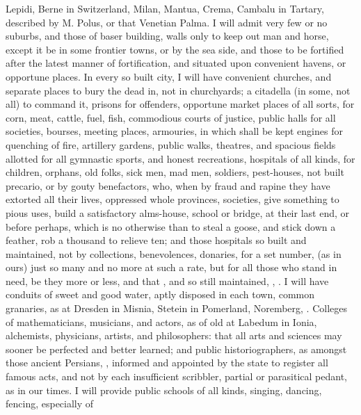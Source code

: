 Lepidi, Berne in Switzerland, Milan, Mantua, Crema, Cambalu in Tartary,
described by M. Polus, or that Venetian Palma. I will admit very few or
no suburbs, and those of baser building, walls only to keep out man and
horse, except it be in some frontier towns, or by the sea side, and
those to be fortified  after the latest manner of fortification,
and situated upon convenient havens, or opportune places. In every so
built city, I will have convenient churches, and separate places to
bury the dead in, not in churchyards; a citadella (in some, not all) to
command it, prisons for offenders, opportune market places of all
sorts, for corn, meat, cattle, fuel, fish, commodious courts of
justice, public halls for all societies, bourses, meeting places,
armouries, in which shall be kept engines for quenching of fire,
artillery gardens, public walks, theatres, and spacious fields allotted
for all gymnastic sports, and honest recreations, hospitals of all
kinds, for children, orphans, old folks, sick men, mad men, soldiers,
pest-houses, \etc{} not built precario, or by gouty benefactors, who, when
by fraud and rapine they have extorted all their lives, oppressed whole
provinces, societies, \etc{} give something to pious uses, build a
satisfactory alms-house, school or bridge, \etc{} at their last end, or
before perhaps, which is no otherwise than to steal a goose, and stick
down a feather, rob a thousand to relieve ten; and those hospitals so
built and maintained, not by collections, benevolences, donaries, for a
set number, (as in ours) just so many and no more at such a rate, but
for all those who stand in need, be they more or less, and that , and so still maintained, ,
\etc{}. I will have conduits of sweet and good water, aptly disposed in
each town, common  granaries, as at Dresden in Misnia, Stetein in
Pomerland, Noremberg, \etc{}. Colleges of mathematicians, musicians, and
actors, as of old at Labedum in Ionia, alchemists, physicians,
artists, and philosophers: that all arts and sciences may sooner be
perfected and better learned; and public historiographers, as amongst
those ancient Persians, , informed and appointed by the state to
register all famous acts, and not by each insufficient scribbler,
partial or parasitical pedant, as in our times. I will provide public
schools of all kinds, singing, dancing, fencing, \etc{} especially of
